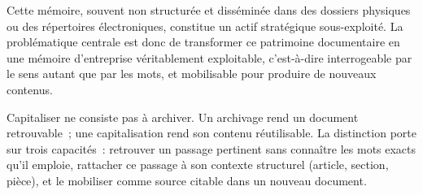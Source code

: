 Cette mémoire, souvent non structurée et disséminée dans des dossiers physiques
ou des répertoires électroniques, constitue un actif stratégique
sous-exploité. La problématique centrale est donc de transformer ce patrimoine
documentaire en une mémoire d'entreprise véritablement exploitable, c'est-à-dire
interrogeable par le sens autant que par les mots, et mobilisable pour produire
de nouveaux contenus.

\begin{btpbox}
Capitaliser ne consiste pas à archiver. Un archivage rend un document
retrouvable~; une capitalisation rend son contenu réutilisable. La distinction
porte sur trois capacités~: retrouver un passage pertinent sans connaître les
mots exacts qu'il emploie, rattacher ce passage à son contexte structurel
(article, section, pièce), et le mobiliser comme source citable dans un nouveau
document.
\end{btpbox}

